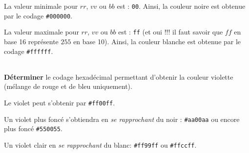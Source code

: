 \documentclass[a4paper,17pt]{extarticle}
\newenvironment{eleve}%
{\begin{activite}\color{noiramu}\\}
{\end{activite}}
\begin{document}
\begin{exemple}
    La valeur minimale pour \(rr\), \(vv\) ou \(bb\) est : \texttt{00}.
Ainsi, la couleur noire est obtenue par le codage \texttt{\#000000}.

La valeur maximale pour \(rr\), \(vv\) ou \(bb\) est : \texttt{ff} (et
oui !!! il faut savoir que \(ff\) en base 16 représente \(255\) en base
10). Ainsi, la couleur blanche est obtenue par le codage
\texttt{\#ffffff}.

            \end{exemple}\begin{eleve}
    \textbf{Déterminer} le codage hexadécimal permettant d'obtenir la
couleur violette (mélange de rouge et de bleu uniquement).
        
        \end{eleve}\begin{reponse}
    Le violet peut s'obtenir par \texttt{\#ff00ff}.

Un violet plus foncé s'obtiendra en \emph{se rapprochant} du noir :
\texttt{\#aa00aa} ou encore plus foncé \texttt{\#550055}.

Un violet clair en \emph{se rapprochant} du blanc: \texttt{\#ff99ff} ou
\texttt{\#ffccff}.


\end{reponse}
\end{document}

